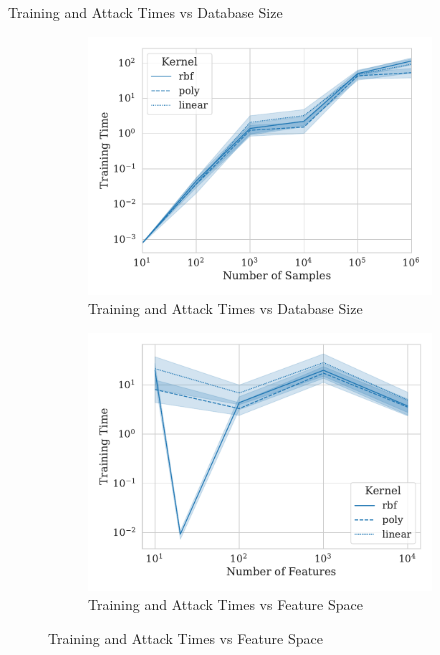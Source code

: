 \documentclass{beamer}
\begin{document}
\begin{frame}{Training and Attack Times vs Database Size}
  \begin{figure}
    \centering
    \begin{subfigure}{.45\textwidth}
      \centering
      \includegraphics[width=\textwidth]{./generated/train_time_vs_samples.pdf}
      \caption{Training and Attack Times vs Database Size}
    \end{subfigure}
    \hfill
    \begin{subfigure}{.45\textwidth}
      \centering
      \includegraphics[width=\textwidth]{./generated/train_time_vs_features.pdf}
      \caption{Training and Attack Times vs Feature Space}
    \end{subfigure}
  \end{figure}
\end{frame}
\end{document}
